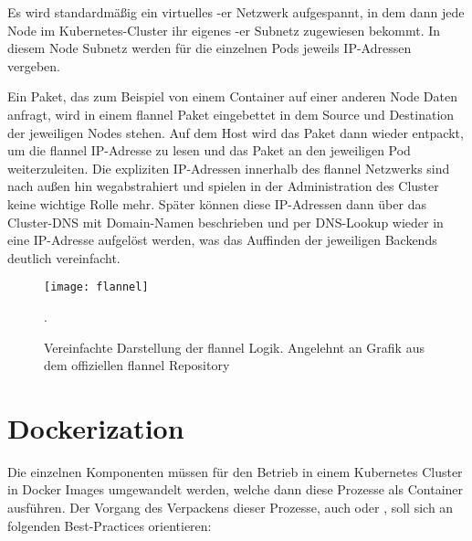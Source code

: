 Es wird standardmäßig ein virtuelles -er Netzwerk aufgespannt, in dem
dann jede Node im Kubernetes-Cluster ihr eigenes -er Subnetz
zugewiesen bekommt.
In diesem Node Subnetz werden für die einzelnen Pods jeweils
IP-Adressen vergeben.

Ein Paket, das zum Beispiel
von einem Container auf einer anderen Node Daten anfragt, wird
in einem flannel Paket eingebettet in dem Source und Destination der jeweiligen
Nodes stehen.
Auf dem Host wird das Paket dann wieder entpackt, um die flannel IP-Adresse zu
lesen und das Paket an den jeweiligen Pod weiterzuleiten.
Die expliziten IP-Adressen innerhalb des flannel Netzwerks sind nach außen
hin wegabstrahiert
und spielen in der Administration des Cluster keine wichtige Rolle mehr.
Später können diese IP-Adressen dann über das Cluster-DNS mit Domain-Namen
beschrieben und per DNS-Lookup wieder in eine IP-Adresse aufgelöst werden, was das
Auffinden der
jeweiligen Backends deutlich vereinfacht.

\begin{figure}[H]
\centering
\texttt{[image: flannel]}
\caption{Vereinfachte Darstellung der flannel Logik. Angelehnt an Grafik aus
dem offiziellen flannel Repository \cite{flannel}}.
\end{figure}

\section{Dockerization}

Die einzelnen Komponenten müssen für den Betrieb in einem Kubernetes Cluster in
Docker Images umgewandelt werden, welche dann diese Prozesse als Container
ausführen.
Der Vorgang des Verpackens dieser Prozesse, auch 
oder ,
soll sich an folgenden Best-Practices orientieren:

